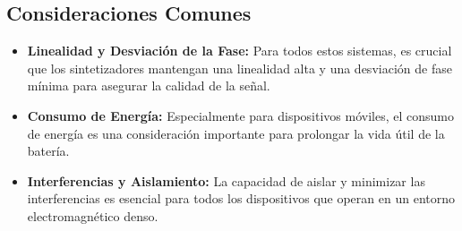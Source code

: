 \subsection{Consideraciones Comunes}

\begin{itemize}
    \item \textbf{Linealidad y Desviación de la Fase:} Para todos estos sistemas, es crucial que los sintetizadores mantengan una linealidad alta y una desviación de fase mínima para asegurar la calidad de la señal.
    \item \textbf{Consumo de Energía:} Especialmente para dispositivos móviles, el consumo de energía es una consideración importante para prolongar la vida útil de la batería.
    \item \textbf{Interferencias y Aislamiento:} La capacidad de aislar y minimizar las interferencias es esencial para todos los dispositivos que operan en un entorno electromagnético denso.
\end{itemize}
